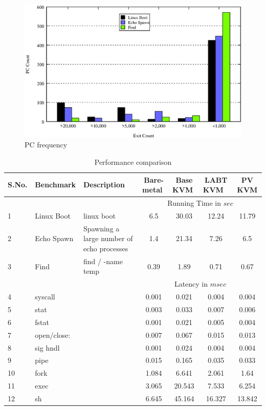 \documentclass[10pt,twocolumn]{article}
\begin{document}
\begin{figure}[!htb]
\centering

\includegraphics[scale=0.5]{pc_count.eps}
\caption{PC frequency}
\label{fig:pc_profile}
\end{figure}

\begin{table}
\centering
\caption{Performance comparison}
      \begin{tabular}{|l| l|p{5cm} | c c c c|} \hline
	        S.No.\verb, ,&  Benchmark\verb, ,& Description  & Bare-metal \verb, ,& Base KVM \verb, , & LABT KVM \verb, ,& PV KVM \\ \hline

     &&& \multicolumn{4}{c|}{ Running Time in $sec$}\\\cline {4-7}  
      1&  Linux Boot& linux boot & 6.5	& 30.03	& 12.24	& 11.79 \\ \hline
      2& Echo Spawn	& Spawning a large number of echo processes&1.4	& 21.34 &	7.26 &	6.5 \\\hline
      3& Find	& find / -name temp & 0.39	& 1.89	& 0.71	& 0.67 \\ \cline{4-7}
	   &&& \multicolumn{4}{c|}{Latency in $msec$}\\  \cline{4-7}

  4& syscall	& &	0.001	&	0.021	&	0.004	&	0.004	\\\hline
5&stat	&&	0.003	&	0.033	&	0.007	&	0.006	\\\hline
6&fstat	&&	0.001	&	0.021	&	0.005	&	0.004	\\\hline
7&open/close:	&&	0.007	&	0.067	&	0.015	&	0.013	\\\hline
8&sig hndl	&&	0.001	&	0.024	&	0.004	&	0.004	\\\hline
9&pipe 	&&	0.015	&	0.165	&	0.035	&	0.033	\\\hline
10&fork	&&	1.084	&	6.641	&	2.061	&	1.64	\\\hline
11&exec	&&	3.065	&	20.543	&	7.533	&	6.254	\\\hline
12&sh	&&	6.645	&	45.164	&	16.327	&	13.842	\\\hline

        \hline
      \end{tabular}
\label{tab:lpGMKLsmall}
\end{table} 
\end{document}
